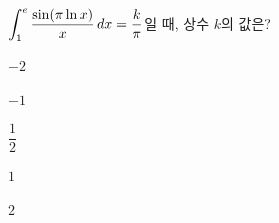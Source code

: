 \hspace*{2mm}\begin{minipage}[t]{\dimexpr\linewidth-2mm\relax}\vspace{0pt}
$\displaystyle\int_{1}^{e}\dfrac{\sin(\pi\ln x)}{x}\mkern3mu dx=\dfrac{k}{\pi}$일 때, 상수 $k$의 값은?
\begin{choices32}{\rule[-3ex]{0pt}{8ex}$-2$}{\rule[-3ex]{0pt}{8ex}$-1$}{\rule[-3ex]{0pt}{8ex}$\dfrac{1}{2}$}{\rule[-3ex]{0pt}{8ex}$1$}{\rule[-3ex]{0pt}{8ex}$2$}\end{choices32}\end{minipage}
